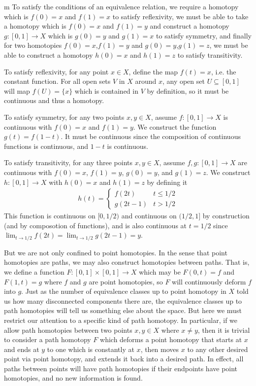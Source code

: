 \documentclass[11pt]{article}
\begin{document}
\begin{my proof}{m}
To satisfy the conditions of an equivalence relation, we require a homotopy which is $f(0) = x$ and $f(1) = x$ to satisfy reflexivity, we must be able to take a homotopy which is $f(0) = x$ and $f(1) = y$ and construct a homotopy $g\colon [0,1] \to X$ which is $g(0) = y$ and $g(1) = x$ to satisfy symmetry, and finally for two homotopies $f(0) = x$,$f(1) = y$ and $g(0) = y$,$g(1) = z$, we must be able to construct a homotopy $h(0) = x$ and $h(1) = z$ to satisfy transitivity.

To satisfy reflexivity, for any point $x \in X$, define the map $f(t) = x$, i.e. the constant function. For all open sets $V$ in $X$ around $x$, any open set $U \subseteq [0,1]$ will map $f(U) = \{x\}$ which is contained in $V$ by definition, so it must be continuous and thus a homotopy.

To satisfy symmetry, for any two points $x,y \in X$, assume $f\colon [0,1] \to X$ is continuous with $f(0)= x$ and $f(1) = y$. We construct the function $g(t) = f(1-t)$. It must be continuous since the composition of continuous functions is continuous, and $1-t$ is continuous.

To satisfy transitivity, for any three points $x,y \in X$, assume $f,g\colon [0,1] \to X$ are continuous with $f(0)= x$, $f(1) = y$, $g(0) = y$, and $g(1) = z$. We construct $h\colon [0,1] \to X$ with $h(0) = x$ and $h(1) = z$ by defining it \begin{gather*}
h(t) = \left\{ \begin{matrix} f(2t) & t \le 1/2 \\ g(2t - 1) & t > 1/2\end{matrix}\right.
\end{gather*}
This function is continuous on $[0,1/2)$ and continuous on $(1/2,1]$ by construction (and by composotion of functions), and is also continuous at $t=1/2$ since $\lim_{t \to 1/2}f(2t) = \lim_{t \to 1/2} g(2t - 1) = y$.
\end{my proof}

But we are not only confined to point homotopies. In the sense that point homotopies are paths, we may also construct homotopies between paths. That is, we define a function $F \colon [0,1] \times [0,1] \to X$ which may be $F(0,t) = f$ and $F(1,t) = g$ where $f$ and $g$ are point homotopies, so $F$ will continuously deform $f$ into $g$. Just as the number of equivalence classes up to point homotopy in $X$ told us how many disconnected components there are, the equivalence classes up to path homotopies will tell us something else about the space. But here we must restrict our attention to a specific kind of path homotopy. In particular, if we allow path homotopies between two points $x,y \in X$ where $x \neq y$, then it is trivial to consider a path homotopy $F$ which deforms a point homotopy that starts at $x$ and ends at $y$ to one which is constantly at $x$, then moves $x$ to any other desired point via point homotopy, and extends it back into a desired path. In effect, all paths between points will have path homotopies if their endpoints have point homotopies, and no new information is found. 
\end{document}
